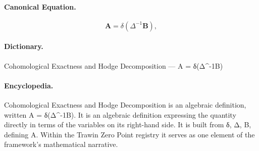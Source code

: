 \paragraph{Canonical Equation.}
\[
\mathbf{A} = \delta(\Delta^{-1}\mathbf{B}),
\]

\paragraph{Dictionary.}
Cohomological Exactness and Hodge Decomposition — A = δ(Δ\textasciicircum{}-1B)

\paragraph{Encyclopedia.}
Cohomological Exactness and Hodge Decomposition is an algebraic definition, written A = δ(Δ\textasciicircum{}-1B). It is an algebraic definition expressing the quantity directly in terms of the variables on its right-hand side. It is built from δ, Δ, B, defining A. Within the Trawin Zero Point registry it serves as one element of the framework's mathematical narrative.
